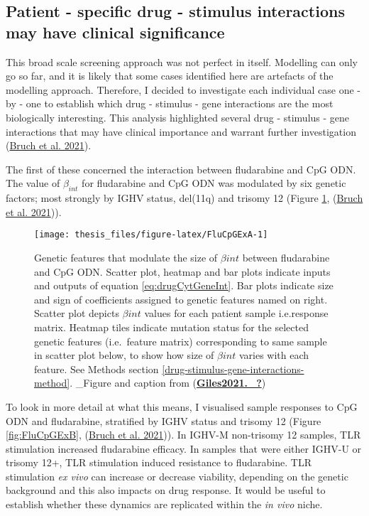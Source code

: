 \documentclass[11pt, a4paper, twosided]{book}
\begin{document}
\hypertarget{patient---specific-drug---stimulus-interactions-may-have-clinical-significance}{%
\subsection{Patient - specific drug - stimulus interactions may have clinical significance}\label{patient---specific-drug---stimulus-interactions-may-have-clinical-significance}}

This broad scale screening approach was not perfect in itself. Modelling can only go so far, and it is likely that some cases identified here are artefacts of the modelling approach. Therefore, I decided to investigate each individual case one - by - one to establish which drug - stimulus - gene interactions are the most biologically interesting. This analysis highlighted several drug - stimulus - gene interactions that may have clinical importance and warrant further investigation (\protect\hyperlink{ref-Giles2021}{Bruch et al. 2021}).

The first of these concerned the interaction between fludarabine and CpG ODN. The value of \(\beta_{int}\) for fludarabine and CpG ODN was modulated by six genetic factors; most strongly by IGHV status, del(11q) and trisomy 12 (Figure \ref{fig:FluCpGExA}, (\protect\hyperlink{ref-Giles2021}{Bruch et al. 2021})).


\begin{figure}

{\centering \texttt{[image: thesis\_files/figure-latex/FluCpGExA-1]} 

}

\caption{Genetic features that modulate the size of \(\beta{int}\) between fludarabine and CpG ODN. Scatter plot, heatmap and bar plots indicate inputs and outputs of equation \eqref{eq:drugCytGeneInt}. Bar plots indicate size and sign of coefficients assigned to genetic features named on right. Scatter plot depicts \(\beta{int}\) values for each patient sample i.e.response matrix. Heatmap tiles indicate mutation status for the selected genetic features (i.e.~feature matrix) corresponding to same sample in scatter plot below, to show how size of \(\beta{int}\) varies with each feature. See Methods section \ref{drug-stimulus-gene-interactions-method}. \_Figure and caption from (\protect\hyperlink{ref-Giles2021._}{\textbf{Giles2021.\_?}})}\label{fig:FluCpGExA}
\end{figure}
To look in more detail at what this means, I visualised sample responses to CpG ODN and fludarabine, stratified by IGHV status and trisomy 12 (Figure \ref{fig:FluCpGExB}, (\protect\hyperlink{ref-Giles2021}{Bruch et al. 2021})). In IGHV-M non-trisomy 12 samples, TLR stimulation increased fludarabine efficacy. In samples that were either IGHV-U or trisomy 12+, TLR stimulation induced resistance to fludarabine. TLR stimulation \emph{ex vivo} can increase or decrease viability, depending on the genetic background and this also impacts on drug response. It would be useful to establish whether these dynamics are replicated within the \emph{in vivo} niche.
\end{document}

